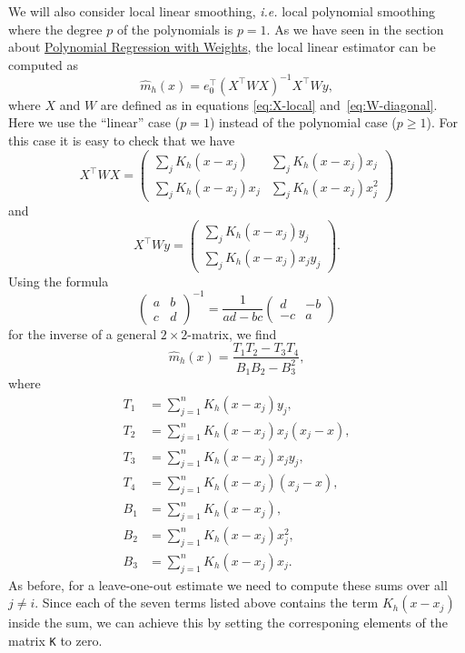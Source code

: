 \documentclass[
  a4paper,
]{article}
\theoremstyle{definition}
\theoremstyle{definition}
\theoremstyle{definition}
\theoremstyle{definition}
\theoremstyle{remark}
\begin{document}
We will also consider local linear smoothing, \emph{i.e.} local polynomial
smoothing where the degree \(p\) of the polynomials is \(p=1\).
As we have seen in the section about \hyperref[polynomial-regression-with-weights]{Polynomial Regression with Weights},
the local linear estimator can be computed as
\begin{equation*}
  \hat m_h(x)
  = e_0^\top (X^\top W X)^{-1} X^\top W y,
\end{equation*}
where \(X\) and \(W\) are defined as in equations \eqref{eq:X-local}
and~\eqref{eq:W-diagonal}.
Here we use the ``linear'' case (\(p=1\)) instead of the polynomial case (\(p\geq 1\)).
For this case it is easy to check that we have
\begin{equation*}
  X^\top W X
  = \begin{pmatrix}
        \sum_j K_h(x-x_j)     & \sum_j K_h(x-x_j) x_j   \\
        \sum_j K_h(x-x_j) x_j & \sum_j K_h(x-x_j) x_j^2
    \end{pmatrix}
\end{equation*}
and
\begin{equation*}
  X^\top W y
  = \begin{pmatrix}
        \sum_j K_h(x-x_j) y_j     \\
        \sum_j K_h(x-x_j) x_j y_j
    \end{pmatrix}.
\end{equation*}
Using the formula
\begin{equation*}
  \begin{pmatrix}
    a & b \\
    c & d
  \end{pmatrix}^{-1}
  = \frac{1}{ad-bc} \begin{pmatrix}
    d & -b \\
    -c & a
  \end{pmatrix}
\end{equation*}
for the inverse of a general \(2\times 2\)-matrix, we find
\begin{equation*}
  \hat m_h(x)
  = \frac{T_1 T_2 - T_3 T_4}{B_1 B_2 - B_3^2},
\end{equation*}
where
\begin{align*}
  T_1 &= \sum_{j=1}^n K_h(x-x_j) y_j       , \\
  T_2 &= \sum_{j=1}^n K_h(x-x_j) x_j(x_j-x), \\
  T_3 &= \sum_{j=1}^n K_h(x-x_j) x_j y_j   , \\
  T_4 &= \sum_{j=1}^n K_h(x-x_j) (x_j-x)   , \\
  B_1 &= \sum_{j=1}^n K_h(x-x_j)           , \\
  B_2 &= \sum_{j=1}^n K_h(x-x_j) x_j^2     , \\
  B_3 &= \sum_{j=1}^n K_h(x-x_j) x_j       .
\end{align*}
As before, for a leave-one-out estimate we need to compute these sums over all
\(j\neq i\). Since each of the seven terms listed above contains the term
\(K_h(x-x_j)\) inside the sum, we can achieve this by setting the corresponing
elements of the matrix \texttt{K} to zero.
\end{document}
